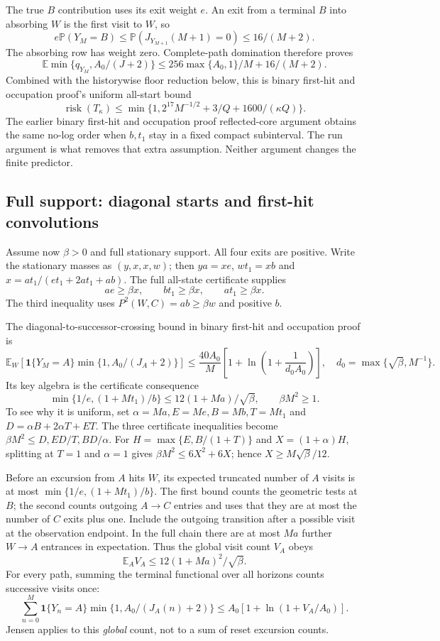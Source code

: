\documentclass[11pt,letterpaper]{article}
\theoremstyle{definition}\newtheorem{definition}[theorem]{Definition}
\theoremstyle{remark}\newtheorem{remark}[theorem]{Remark}
\newcommand{\E}{\mathbb{E}}
\newcommand{\Prob}{\mathbb{P}}
\newcommand{\ind}{\mathbf{1}}
\begin{document}
The true $B$ contribution uses its exit weight $e$. An exit from a terminal $B$ into absorbing $W$ is the first visit to $W$, so
\[
 e\Prob(Y_M=B)
 \le\Prob(J_{Y_{M+1}}(M+1)=0)\le16/(M+2).
\]
The absorbing row has weight zero. Complete-path domination therefore proves
\[
 \E\min\{q_{Y_M},A_0/(J+2)\}
 \le256\max\{A_0,1\}/M+16/(M+2).
\]
Combined with the historywise floor reduction below, this is binary first-hit and occupation proof's uniform all-start bound
\begin{equation}\label{eq:absorbingrisk}
 \operatorname{risk}(T_\kappa)
 \le\min\{1,2^{17}M^{-1/2}+3/Q+1600/(\kappa Q)\}.
\end{equation}
The earlier binary first-hit and occupation proof reflected-core argument obtains the same no-log order when $b,t_1$ stay in a fixed compact subinterval. The run argument is what removes that extra assumption. Neither argument changes the finite predictor.

\subsection{Full support: diagonal starts and first-hit convolutions}
Assume now $\beta>0$ and full stationary support. All four exits are positive. Write the stationary masses as $(y,x,x,w)$; then
$ya=xe$, $wt_1=xb$ and $x=at_1/(et_1+2at_1+ab)$.
The full all-state certificate supplies
\[
 ae\ge\beta x,\qquad bt_1\ge\beta x,\qquad at_1\ge\beta x.
\]
The third inequality uses $P^2(W,C)=ab\ge\beta w$ and positive $b$.

The diagonal-to-successor-crossing bound in binary first-hit and occupation proof is
\begin{equation}\label{eq:diagcross}
 \E_W\!\left[\ind\{Y_M=A\}\min\{1,A_0/(J_A+2)\}\right]
 \le\frac{40A_0}{M}
 \left[1+\ln\left(1+\frac1{d_0A_0}\right)\right],
 \quad d_0=\max\{\sqrt\beta,M^{-1}\}.
\end{equation}
Its key algebra is the certificate consequence
\[
 \min\{1/e,(1+Mt_1)/b\}
 \le12(1+Ma)/\sqrt\beta,\qquad \beta M^2\ge1.
\]
To see why it is uniform, set
$\alpha=Ma,E=Me,B=Mb,T=Mt_1$ and
$D=\alpha B+2\alpha T+ET$. The three certificate inequalities become
$\beta M^2\le D,ED/T,BD/\alpha$.
For $H=\max\{E,B/(1+T)\}$ and $X=(1+\alpha)H$, splitting at $T=1$ and $\alpha=1$ gives
$\beta M^2\le6X^2+6X$; hence $X\ge M\sqrt\beta/12$.

Before an excursion from $A$ hits $W$, its expected truncated number of $A$ visits is at most
$\min\{1/e,(1+Mt_1)/b\}$.
The first bound counts the geometric tests at $B$; the second counts outgoing $A\to C$ entries and uses that they are at most the number of $C$ exits plus one. Include the outgoing transition after a possible visit at the observation endpoint. In the full chain there are at most $Ma$ further $W\to A$ entrances in expectation. Thus the global visit count $V_A$ obeys
\[
 \E_A V_A\le12(1+Ma)^2/\sqrt\beta .
\]
For every path, summing the terminal functional over all horizons counts successive visits once:
\[
 \sum_{n=0}^M
 \ind\{Y_n=A\}\min\{1,A_0/(J_A(n)+2)\}
 \le A_0[1+\ln(1+V_A/A_0)].
\]
Jensen applies to this \emph{global} count, not to a sum of reset excursion counts.
\end{document}
